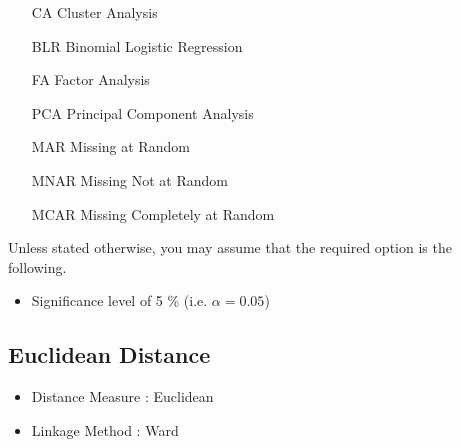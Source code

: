 
\begin{itemize}
	\item[CA] Cluster Analysis
	\item[BLR] Binomial Logistic Regression
	\item[FA] Factor Analysis
	\item[PCA] Principal Component Analysis
    \item[MAR] Missing at Random
    \item[MNAR] Missing Not at Random
    \item[MCAR] Missing Completely at Random
\end{itemize}

Unless stated otherwise, you may assume that the required option is the following.

\begin{itemize}
	\item Significance level of 5 \% (i.e. $\alpha = 0.05$)
\end{itemize}

\subsection*{Euclidean Distance}
\begin{itemize}
	\item Distance Measure :  Euclidean
	\item Linkage Method : Ward
\end{itemize}